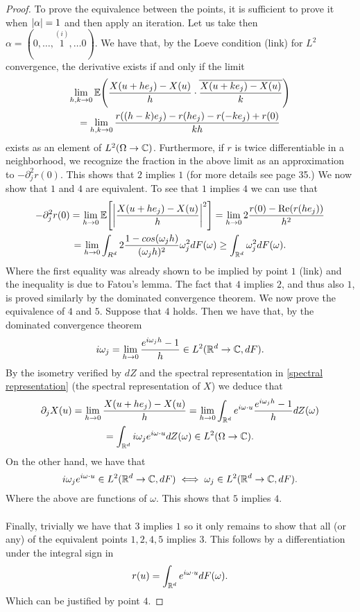 \documentclass[12pt]{article}
\begin{document}
\begin{proof}
	To prove the equivalence between the points, it is sufficient to prove it when $\abs{\alpha}=1$ and then apply an iteration. Let us take then\\ $\alpha=(0,\ldots,\overset{(i)}{1},\ldots 0)$. We have that, by the Loeve condition (link) for $L^2$ convergence, the derivative exists if and only if the limit
	\begin{multline*}
		\lim_{h,k \to 0}\mathbb{E}\qty(\frac{X(u+he_j)-X(u)}{h}\cdot\overline{\frac{X(u+ke_j)-X(u)}{k}})\\=
		\lim_{h,k \to 0}\frac{r((h-k)e_j)-r(he_j)-r(-ke_j)+r(0)}{kh}
	\end{multline*}
	exists as an element of $L^2(\Omega\to\mathbb{C})$. Furthermore, if $r$ is twice differentiable in a neighborhood, we recognize the fraction in the above limit as an approximation to $-\partial_j^2r(0)$. This shows that $2$ implies  $1$ (for more details see \cite{lindgren2012stationary} page 35.) We now show that $1$ and $4$ are equivalent. To see that $1$ implies  $4$ we can use that
	\begin{multline*}
		-\partial_j^2 r(0)=\lim_{h \to 0}\mathbb{E}\qty[\abs{\frac{X(u+he_j)-X(u)}{h}}^2]=\lim_{h \to 0}2\frac{r(0)-\Re(r(he_j))}{h^2}\\=\lim_{h\to 0}
		\int_{R^d}2\frac{1-cos(\omega_j h)}{(\omega_jh)^2}\omega_j^2dF(\omega)\geq\int_{{\mathbb R}^d}\omega_j^2dF(\omega).
	\end{multline*}
	Where the first equality was already shown to be implied by point $1$ (link) and the inequality is due to Fatou's lemma. The fact that $4$ implies $2$, and thus also $1$, is proved similarly by the dominated convergence theorem.  We now prove the equivalence of $4$ and $5$. Suppose that  $4$ holds. Then we have  that, by the dominated convergence theorem
	\begin{equation*}
		i\omega_j=\lim_{h\to 0}\frac{e^{i\omega_j h}-1}{h}\in L^2({\mathbb R}^d\to\mathbb{C},dF).
	\end{equation*}
	By the isometry verified by $dZ$  and the spectral representation in \eqref{spectral representation} (the spectral representation of $X$)   we deduce that
	\begin{multline*}
		\partial_j X(u)=\lim_{h \to 0}\frac{X(u+he_j)-X(u)}{h}=\lim_{h \to 0}\int_{{\mathbb R}^d}e^{i\omega\cdot u} \frac{e^{i\omega_j h}-1}{h} dZ(\omega)\\
		=\int_{{\mathbb R}^d}i\omega_j e^{i\omega\cdot u}dZ(\omega)\in L^2(\Omega\to\mathbb{C}).
	\end{multline*}
	On the other hand, we have that $$i\omega_je^{i\omega\cdot u}\in L^2({\mathbb R}^d\to\mathbb{C},dF)\iff\omega_j\in L^2({\mathbb R}^d\to\mathbb{C},dF).$$
	Where the above are functions of $\omega$. This shows that $5$ implies $4$.
	\\
	\\
	Finally, trivially we have that $3$ implies $1$ so it only remains to show that all (or any) of the equivalent points $1,2,4,5$ implies $3$. This follows by a differentiation under the integral sign in
	\begin{equation*}
		r(u)=\int_{{\mathbb R}^d}e^{i\omega\cdot u}dF(\omega).
	\end{equation*}
	Which can be justified by point $4$.
\end{proof}
\end{document}
